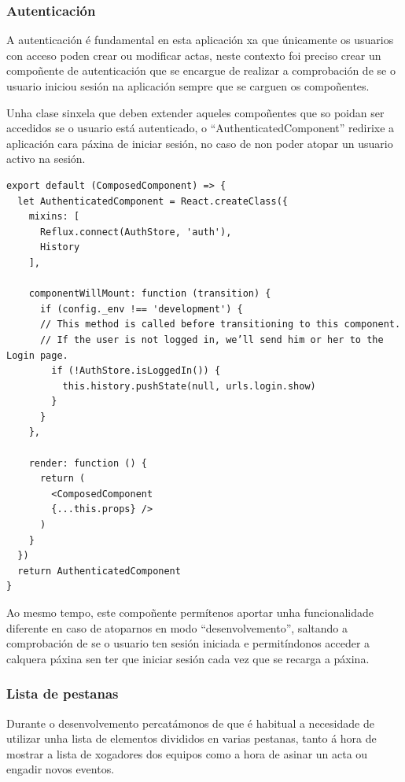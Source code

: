       \subsubsection{Autenticación}
      A autenticación é fundamental en esta aplicación xa que únicamente os 
usuarios con acceso poden crear ou modificar actas, neste contexto foi preciso 
crear un compoñente de autenticación que se encargue de realizar a comprobación 
de se o usuario iniciou sesión na aplicación sempre que se carguen os 
compoñentes.

      Unha clase sinxela que deben extender aqueles compoñentes que so poidan 
ser accedidos se o usuario está autenticado, o ``AuthenticatedComponent'' 
redirixe a aplicación cara páxina de iniciar sesión, no caso de non poder 
atopar un usuario activo na sesión.

    \begin{lstlisting}[frame=single, caption=Compoñente de autenticación.]
export default (ComposedComponent) => {
  let AuthenticatedComponent = React.createClass({
    mixins: [
      Reflux.connect(AuthStore, 'auth'),
      History
    ],

    componentWillMount: function (transition) {
      if (config._env !== 'development') {
      // This method is called before transitioning to this component.
      // If the user is not logged in, we’ll send him or her to the Login page.
        if (!AuthStore.isLoggedIn()) {
          this.history.pushState(null, urls.login.show)
        }
      }
    },

    render: function () {
      return (
        <ComposedComponent
        {...this.props} />
      )
    }
  })
  return AuthenticatedComponent
}
    \end{lstlisting}

    Ao mesmo tempo, este compoñente permítenos aportar unha funcionalidade 
diferente en caso de atoparnos en modo ``desenvolvemento'', saltando a 
comprobación de se o usuario ten sesión iniciada e permitíndonos acceder a 
calquera páxina sen ter que iniciar sesión cada vez que se recarga a páxina.

      \subsubsection{Lista de pestanas}
      Durante o desenvolvemento percatámonos de que é habitual a necesidade de 
utilizar unha lista de elementos divididos en varias pestanas, tanto á hora de 
mostrar a lista de xogadores dos equipos como a hora de asinar un acta ou 
engadir novos eventos.

